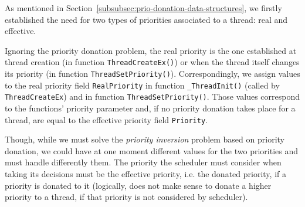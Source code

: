 As mentioned in Section~\ref{subsubsec:prio-donation-data-structures}, we firstly established the need for two types of priorities associated to a thread: real and effective. 

Ignoring the priority donation problem, the real priority is the one established at thread creation (in function \lstinline|ThreadCreateEx()|) or when the thread itself changes its priority (in function \lstinline|ThreadSetPriority()|). Correspondingly, we assign values to the real priority field \lstinline|RealPriority| in function \lstinline|_ThreadInit()| (called by \lstinline|ThreadCreateEx|) and in function \lstinline|ThreadSetPriority()|. Those values correspond to the functions' priority parameter and, if no priority donation takes place for a thread, are equal to the effective priority field \lstinline|Priority|.

Though, while we must solve the \textit{priority inversion} problem based on priority donation, we could have at one moment different values for the two priorities and must handle differently them. The priority the scheduler must consider when taking its decisions must be the effective priority, i.e. the donated priority, if a priority is donated to it (logically, does not make sense to donate a higher priority to a thread, if that priority is not considered by scheduler). 

